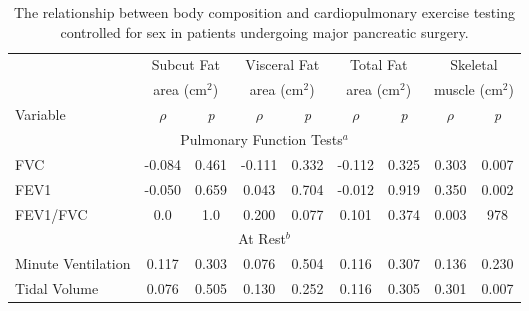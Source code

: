 \begin{table}[p]
	\caption{The relationship between body composition and cardiopulmonary exercise testing controlled for sex in patients undergoing major pancreatic surgery.}
	\label{table:bc_cpet}
	\footnotesize
	\centering
	\renewcommand{\arraystretch}{1.5} %
	\begin{tabular}{|l| c c | c c | c c | c c|}
		\hline
		                          &  \multicolumn{2}{c|}{Subcut Fat}   & \multicolumn{2}{c|}{Visceral Fat}  &   \multicolumn{2}{c|}{Total Fat}   &    \multicolumn{2}{c|}{Skeletal}     \\
		                          & \multicolumn{2}{c|}{area (cm$^2$)} & \multicolumn{2}{c|}{area (cm$^2$)} & \multicolumn{2}{c|}{area (cm$^2$)} & \multicolumn{2}{c|}{muscle (cm$^2$)} \\
		Variable                  & $\rho$ & \textit{p}                & $\rho$ & \textit{p}                & $\rho$ & \textit{ p}               & $\rho$ & \textit{p}                  \\ \hline
		\multicolumn{9}{|c|}{Pulmonary Function Tests$^a$}                                                                                                                              \\ \hline
		FVC                       & -0.084 & 0.461                     & -0.111 & 0.332                     & -0.112 & 0.325                     & 0.303  & 0.007                       \\
		FEV1                      & -0.050 & 0.659                     & 0.043  & 0.704                     & -0.012 & 0.919                     & 0.350  & 0.002                       \\
		FEV1/FVC                  & 0.0    & 1.0                       & 0.200  & 0.077                     & 0.101  & 0.374                     & 0.003  & 978                         \\ \hline
		\multicolumn{9}{|c|}{At Rest$^b$}                                                                                                                                               \\ \hline
		Minute Ventilation        & 0.117  & 0.303                     & 0.076  & 0.504                     & 0.116  & 0.307                     & 0.136  & 0.230                       \\
		Tidal Volume              & 0.076  & 0.505                     & 0.130  & 0.252                     & 0.116  & 0.305                     & 0.301  & 0.007                       \\

\end{tabular}
\end{table}
